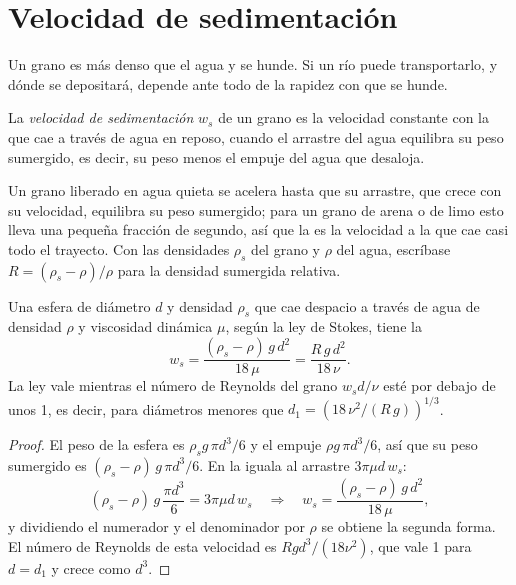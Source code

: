 \section{Velocidad de sedimentación}\label{sec:b1:erosion-transport:settling}

Un grano es más denso que el agua y se hunde. Si un río puede transportarlo, y dónde se depositará, depende ante todo de la rapidez con que se hunde.

\begin{definition}\label{def:b1:erosion-transport:settling}
La \emph{velocidad de sedimentación} $w_s$ de un grano es la velocidad constante con la que cae a través de agua en reposo, cuando
el arrastre del agua equilibra su peso sumergido, es decir, su peso menos el empuje del agua que desaloja.
\end{definition}

Un grano liberado en agua quieta se acelera hasta que su arrastre, que crece con su velocidad, equilibra su peso sumergido; para un grano de arena o de limo esto
lleva una pequeña fracción de segundo, así que la  es la velocidad a la que cae casi todo el trayecto. Con las densidades $\rho_s$
del grano y $\rho$ del agua, escríbase $R = (\rho_s - \rho)/\rho$ para la densidad sumergida relativa.

\begin{proposition}\label{prop:b1:erosion-transport:stokes}
Una esfera de diámetro $d$ y densidad $\rho_s$ que cae despacio a través de agua de densidad $\rho$ y viscosidad dinámica $\mu$, según la ley de Stokes,
tiene la 
\[
  w_s = \frac{(\rho_s - \rho)\,g\,d^2}{18\,\mu} = \frac{R\,g\,d^2}{18\,\nu}.
\]
La ley vale mientras el número de Reynolds del grano $w_s d/\nu$ esté por debajo de unos 1, es decir, para diámetros menores que
$d_1 = \left(18\,\nu^2/(R\,g)\right)^{1/3}$.
\end{proposition}

\begin{proof}
El peso de la esfera es $\rho_s g\,\pi d^3/6$ y el empuje $\rho g\,\pi d^3/6$, así que su peso sumergido es $(\rho_s - \rho)\,g\,\pi d^3/6$.
En la  iguala al arrastre $3\pi\mu d\,w_s$:
\[
  (\rho_s - \rho)\,g\,\frac{\pi d^3}{6} = 3\pi\mu d\,w_s
  \quad\Longrightarrow\quad
  w_s = \frac{(\rho_s - \rho)\,g\,d^2}{18\,\mu},
\]
y dividiendo el numerador y el denominador por $\rho$ se obtiene la segunda forma. El número de Reynolds de esta velocidad es $R g d^3/(18\nu^2)$, que
vale 1 para $d = d_1$ y crece como $d^3$.
\end{proof}

